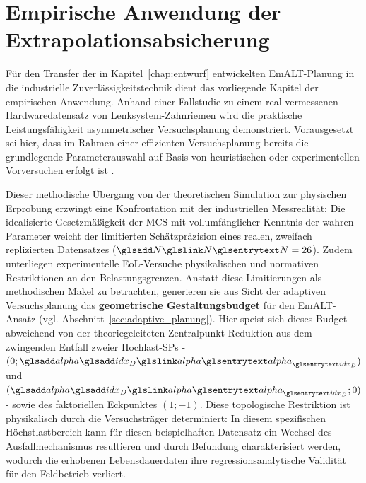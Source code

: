 
\chapter{Empirische Anwendung der Extrapolationsabsicherung} \label{chap:casestudy}

Für den Transfer der in Kapitel~\ref{chap:entwurf} entwickelten \ac{EmALT}-Planung in die industrielle Zuverlässigkeitstechnik dient das vorliegende Kapitel der empirischen Anwendung.
Anhand einer Fallstudie zu einem real vermessenen Hardwaredatensatz von Lenksystem-Zahnriemen \cite{Arndt.2026} wird die praktische Leistungsfähigkeit asymmetrischer Versuchsplanung demonstriert.
Vorausgesetzt sei hier, dass im Rahmen einer effizienten Versuchsplanung bereits die grundlegende Parameterauswahl auf Basis von heuristischen oder experimentellen Vorversuchen erfolgt ist \cite{Arndt.2023c}.

Dieser methodische Übergang von der theoretischen Simulation zur physischen Erprobung erzwingt eine Konfrontation mit der industriellen Messrealität:
Die idealisierte Gesetzmäßigkeit der \ac{MCS} mit vollumfänglicher Kenntnis der wahren Parameter weicht der limitierten Schätzpräzision eines realen, zweifach replizierten Datensatzes ($\sym{N} = 26$).
Zudem unterliegen experimentelle \ac{EoL}-Versuche physikalischen und normativen Restriktionen an den Belastungsgrenzen.
Anstatt diese Limitierungen als methodischen Makel zu betrachten, generieren sie aus Sicht der adaptiven Versuchsplanung das \textbf{geometrische Gestaltungsbudget} für den \ac{EmALT}-Ansatz (vgl. Abschnitt~\ref{sec:adaptive_planung}).
Hier speist sich dieses Budget abweichend von der theoriegeleiteten Zentralpunkt-Reduktion aus dem zwingenden Entfall zweier Hochlast-\acp{SP} - $(0 ; \symsub{alpha}{idx_D})$ und $(\symsub{alpha}{idx_D} ; 0)$ - sowie des faktoriellen Eckpunktes $(1; -1)$.
Diese topologische Restriktion ist physikalisch durch die Versuchsträger determiniert: In diesem spezifischen Höchstlastbereich kann für diesen beispielhaften Datensatz ein Wechsel des Ausfallmechanismus resultieren \cite{Perneder.2009,Nagel.2008b} und durch Befundung charakterisiert werden, wodurch die erhobenen Lebensdauerdaten ihre regressionsanalytische Validität für den Feldbetrieb verliert.

